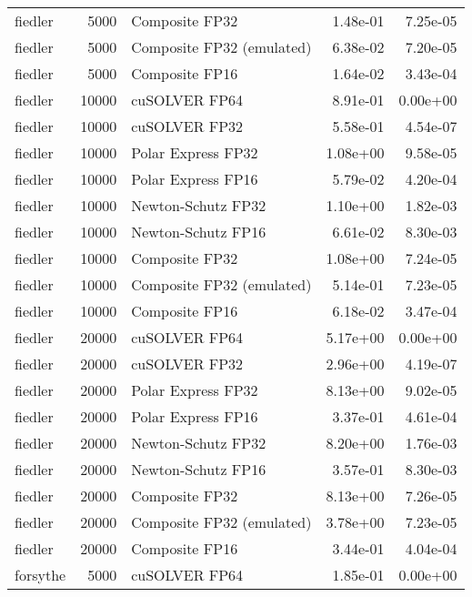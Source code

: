 \begin{table}
\begin{tabular}{lrlrr}
  fiedler &  5000 &            Composite FP32 &  1.48e-01 &        7.25e-05 \\
  fiedler &  5000 & Composite FP32 (emulated) &  6.38e-02 &        7.20e-05 \\
  fiedler &  5000 &            Composite FP16 &  1.64e-02 &        3.43e-04 \\
  fiedler & 10000 &             cuSOLVER FP64 &  8.91e-01 &        0.00e+00 \\
  fiedler & 10000 &             cuSOLVER FP32 &  5.58e-01 &        4.54e-07 \\
  fiedler & 10000 &        Polar Express FP32 &  1.08e+00 &        9.58e-05 \\
  fiedler & 10000 &        Polar Express FP16 &  5.79e-02 &        4.20e-04 \\
  fiedler & 10000 &        Newton-Schutz FP32 &  1.10e+00 &        1.82e-03 \\
  fiedler & 10000 &        Newton-Schutz FP16 &  6.61e-02 &        8.30e-03 \\
  fiedler & 10000 &            Composite FP32 &  1.08e+00 &        7.24e-05 \\
  fiedler & 10000 & Composite FP32 (emulated) &  5.14e-01 &        7.23e-05 \\
  fiedler & 10000 &            Composite FP16 &  6.18e-02 &        3.47e-04 \\
  fiedler & 20000 &             cuSOLVER FP64 &  5.17e+00 &        0.00e+00 \\
  fiedler & 20000 &             cuSOLVER FP32 &  2.96e+00 &        4.19e-07 \\
  fiedler & 20000 &        Polar Express FP32 &  8.13e+00 &        9.02e-05 \\
  fiedler & 20000 &        Polar Express FP16 &  3.37e-01 &        4.61e-04 \\
  fiedler & 20000 &        Newton-Schutz FP32 &  8.20e+00 &        1.76e-03 \\
  fiedler & 20000 &        Newton-Schutz FP16 &  3.57e-01 &        8.30e-03 \\
  fiedler & 20000 &            Composite FP32 &  8.13e+00 &        7.26e-05 \\
  fiedler & 20000 & Composite FP32 (emulated) &  3.78e+00 &        7.23e-05 \\
  fiedler & 20000 &            Composite FP16 &  3.44e-01 &        4.04e-04 \\
 forsythe &  5000 &             cuSOLVER FP64 &  1.85e-01 &        0.00e+00 \\

\end{tabular}
\end{table}
